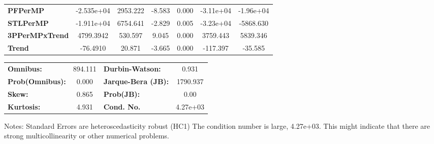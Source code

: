 \begin{center}
\begin{tabular}{lcccccc}
\textbf{PFPerMP}       &   -2.535e+04  &     2953.222     &    -8.583  &         0.000        &    -3.11e+04    &    -1.96e+04     \\
\textbf{STLPerMP}      &   -1.911e+04  &     6754.641     &    -2.829  &         0.005        &    -3.23e+04    &    -5868.630     \\
\textbf{3PPerMPxTrend} &    4799.3942  &      530.597     &     9.045  &         0.000        &     3759.443    &     5839.346     \\
\textbf{Trend}         &     -76.4910  &       20.871     &    -3.665  &         0.000        &     -117.397    &      -35.585     \\
\bottomrule
\end{tabular}
\begin{tabular}{lclc}
\textbf{Omnibus:}       & 894.111 & \textbf{  Durbin-Watson:     } &    0.931  \\
\textbf{Prob(Omnibus):} &   0.000 & \textbf{  Jarque-Bera (JB):  } & 1790.937  \\
\textbf{Skew:}          &   0.865 & \textbf{  Prob(JB):          } &     0.00  \\
\textbf{Kurtosis:}      &   4.931 & \textbf{  Cond. No.          } & 4.27e+03  \\
\bottomrule
\end{tabular}
\end{center}

Notes: \newline
 [1] Standard Errors are heteroscedasticity robust (HC1) \newline
 [2] The condition number is large, 4.27e+03. This might indicate that there are \newline
 strong multicollinearity or other numerical problems.